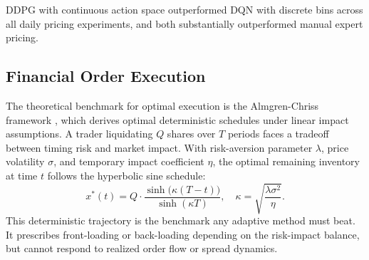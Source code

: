 DDPG with continuous action space outperformed DQN with discrete bins across all daily pricing experiments, and both substantially outperformed manual expert pricing.


\subsection{Financial Order Execution}
\label{sec:execution}

The theoretical benchmark for optimal execution is the Almgren-Chriss framework \citep{Almgren2001execution}, which derives optimal deterministic schedules under linear impact assumptions. A trader liquidating $Q$ shares over $T$ periods faces a tradeoff between timing risk and market impact. With risk-aversion parameter $\lambda$, price volatility $\sigma$, and temporary impact coefficient $\eta$, the optimal remaining inventory at time $t$ follows the hyperbolic sine schedule:
\begin{equation}
x^*(t) = Q \cdot \frac{\sinh\!\bigl(\kappa(T-t)\bigr)}{\sinh(\kappa T)}, \quad \kappa = \sqrt{\frac{\lambda \sigma^2}{\eta}}.
\end{equation}
This deterministic trajectory is the benchmark any adaptive method must beat. It prescribes front-loading or back-loading depending on the risk-impact balance, but cannot respond to realized order flow or spread dynamics.

